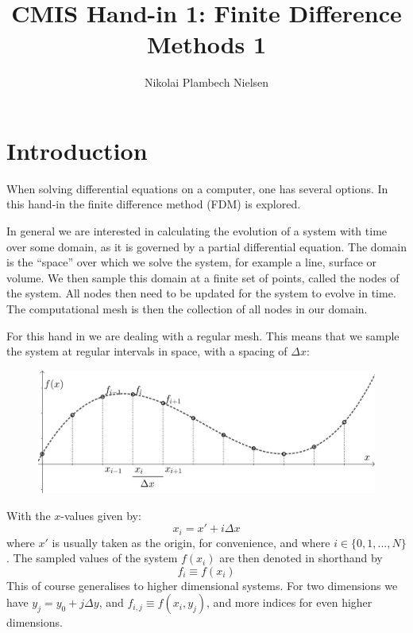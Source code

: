\documentclass[sigconf]{acmart}
\begin{document}
%
\title{CMIS Hand-in 1: Finite Difference Methods 1}

\author{Nikolai Plambech Nielsen}


\maketitle

\section{Introduction}
When solving differential equations on a computer, one has several options. In this hand-in the finite difference method (FDM) is explored.

In general we are interested in calculating the evolution of a system with time over some domain, as it is governed by a partial differential equation. The domain is the ``space'' over which we solve the system, for example a line, surface or volume. We then sample this domain at a finite set of points, called the nodes of the system. All nodes then need to be updated for the system to evolve in time. The computational mesh is then the collection of all nodes in our domain.

For this hand in we are dealing with a regular mesh. This means that we sample the system at regular intervals in space, with a spacing of $ \Delta x $:
\begin{figure}[H]
	\includegraphics[width=\linewidth]{finite_difference1.png}
	
\end{figure}
With the $ x $-values given by:
\begin{equation}\label{key}
	x_i = x' + i \Delta x
\end{equation}
where $ x' $ is usually taken as the origin, for convenience, and where $ i \in \{0,1,...,N\} $. The sampled values of the system $ f(x_i) $ are then denoted in shorthand by
\begin{equation}\label{key}
	f_i \equiv f(x_i)
\end{equation}
This of course generalises to higher dimensional systems. For two dimensions we have $ y_j = y_0 + j \Delta y$, and $ f_{i,j} \equiv f(x_i, y_j) $, and more indices for even higher dimensions.
\end{document}
